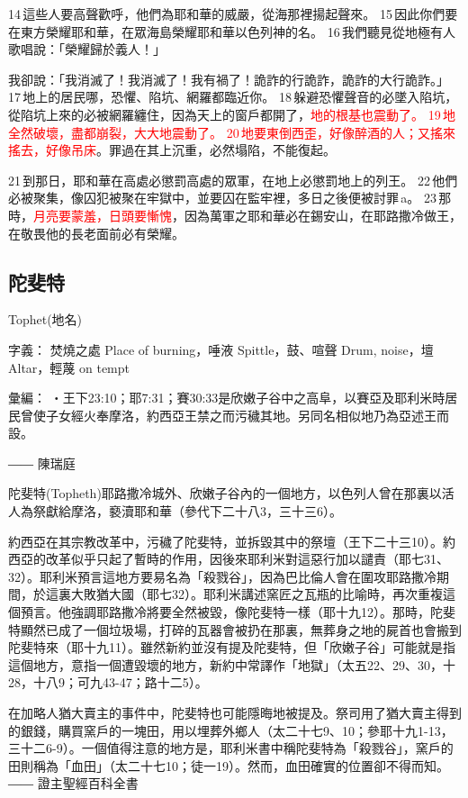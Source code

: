 14 這些人要高聲歡呼，他們為耶和華的威嚴，從海那裡揚起聲來。 15 因此你們要在東方榮耀耶和華，在眾海島榮耀耶和華以色列神的名。 16 我們聽見從地極有人歌唱說：「榮耀歸於義人！」

我卻說：「我消滅了！我消滅了！我有禍了！詭詐的行詭詐，詭詐的大行詭詐。」 17 地上的居民哪，恐懼、陷坑、網羅都臨近你。 18 躲避恐懼聲音的必墜入陷坑，從陷坑上來的必被網羅纏住，因為天上的窗戶都開了，\textcolor{red}{地的根基也震動了。 19 地全然破壞，盡都崩裂，大大地震動了。 20 地要東倒西歪，好像醉酒的人；又搖來搖去，好像吊床}。罪過在其上沉重，必然塌陷，不能復起。


21 到那日，耶和華在高處必懲罰高處的眾軍，在地上必懲罰地上的列王。 22 他們必被聚集，像囚犯被聚在牢獄中，並要囚在監牢裡，多日之後便被討罪 a。 23 那時，\textcolor{red}{月亮要蒙羞，日頭要慚愧}，因為萬軍之耶和華必在錫安山，在耶路撒冷做王，在敬畏他的長老面前必有榮耀。

\subsection{陀斐特}
Tophet(地名)

字義：    焚燒之處 Place of burning，唾液 Spittle，鼓、喧聲 Drum, noise，壇 Altar，輕蔑 on tempt

彙編：    ‧王下23:10；耶7:31；賽30:33是欣嫩子谷中之高阜，以賽亞及耶利米時居民曾使子女經火奉摩洛，約西亞王禁之而污穢其地。另同名相似地乃為亞述王而設。

―― 陳瑞庭

 

陀斐特(Topheth)耶路撒冷城外、欣嫩子谷內的一個地方，以色列人曾在那裏以活人為祭獻給摩洛，褻瀆耶和華（參代下二十八3，三十三6）。

約西亞在其宗教改革中，污穢了陀斐特，並拆毀其中的祭壇（王下二十三10）。約西亞的改革似乎只起了暫時的作用，因後來耶利米對這惡行加以譴責（耶七31、32）。耶利米預言這地方要易名為「殺戮谷」，因為巴比倫人會在圍攻耶路撒冷期間，於這裏大敗猶大國（耶七32）。耶利米講述窯匠之瓦瓶的比喻時，再次重複這個預言。他強調耶路撒冷將要全然被毀，像陀斐特一樣（耶十九12）。那時，陀斐特顯然已成了一個垃圾場，打碎的瓦器會被扔在那裏，無葬身之地的屍首也會搬到陀斐特來（耶十九11）。雖然新約並沒有提及陀斐特，但「欣嫩子谷」可能就是指這個地方，意指一個遭毀壞的地方，新約中常譯作「地獄」（太五22、29、30，十28，十八9；可九43-47；路十二5）。

在加略人猶大賣主的事件中，陀斐特也可能隱晦地被提及。祭司用了猶大賣主得到的銀錢，購買窯戶的一塊田，用以埋葬外鄉人（太二十七9、10；參耶十九1-13，三十二6-9）。一個值得注意的地方是，耶利米書中稱陀斐特為「殺戮谷」，窯戶的田則稱為「血田」（太二十七10；徒一19）。然而，血田確實的位置卻不得而知。―― 證主聖經百科全書

